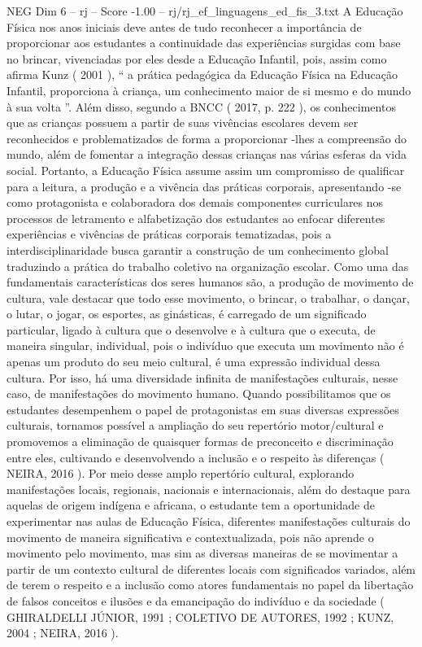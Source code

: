 \begin{textsample}{NEG Dim 6 – rj – Score -1.00 – rj/rj\_ef\_linguagens\_ed\_fis\_3.txt}
A Educação Física nos anos iniciais deve antes de tudo reconhecer a importância de proporcionar aos estudantes a continuidade das experiências surgidas com base no brincar, vivenciadas por eles desde a Educação Infantil, pois, assim como afirma Kunz ( 2001 ), “ a prática pedagógica da Educação Física na Educação Infantil, proporciona à criança, um conhecimento maior de si mesmo e do mundo à sua volta ”.
Além disso, segundo a BNCC ( 2017, p. 222 ), os conhecimentos que as crianças possuem a partir de suas vivências escolares devem ser reconhecidos e problematizados de forma a proporcionar -lhes a compreensão do mundo, além de fomentar a integração dessas crianças nas várias esferas da vida social.
Portanto, a Educação Física assume assim um compromisso de qualificar para a leitura, a produção e a vivência das práticas corporais, apresentando -se como protagonista e colaboradora dos demais componentes curriculares nos processos de letramento e alfabetização dos estudantes ao enfocar diferentes experiências e vivências de práticas corporais tematizadas, pois a interdisciplinaridade busca garantir a construção de um conhecimento global traduzindo a prática do trabalho coletivo na organização escolar.
Como uma das fundamentais características dos seres humanos são, a produção de movimento de cultura, vale destacar que todo esse movimento, o brincar, o trabalhar, o dançar, o lutar, o jogar, os esportes, as ginásticas, é carregado de um significado particular, ligado à cultura que o desenvolve e à cultura que o executa, de maneira singular, individual, pois o indivíduo que executa um movimento não é apenas um produto do seu meio cultural, é uma expressão individual dessa cultura.
Por isso, há uma diversidade infinita de manifestações culturais, nesse caso, de manifestações do movimento humano.
Quando possibilitamos que os estudantes desempenhem o papel de protagonistas em suas diversas expressões culturais, tornamos possível a ampliação do seu repertório motor/cultural e promovemos a eliminação de quaisquer formas de preconceito e discriminação entre eles, cultivando e desenvolvendo a inclusão e o respeito às diferenças ( NEIRA, 2016 ).
Por meio desse amplo repertório cultural, explorando manifestações locais, regionais, nacionais e internacionais, além do destaque para aquelas de origem indígena e africana, o estudante tem a oportunidade de experimentar nas aulas de Educação Física, diferentes manifestações culturais do movimento de maneira significativa e contextualizada, pois não aprende o movimento pelo movimento, mas sim as diversas maneiras de se movimentar a partir de um contexto cultural de diferentes locais com significados variados, além de terem o respeito e a inclusão como atores fundamentais no papel da libertação de falsos conceitos e ilusões e da emancipação do indivíduo e da sociedade ( GHIRALDELLI JÚNIOR, 1991 ; COLETIVO DE AUTORES, 1992 ; KUNZ, 2004 ; NEIRA, 2016 ).

\end{textsample}
